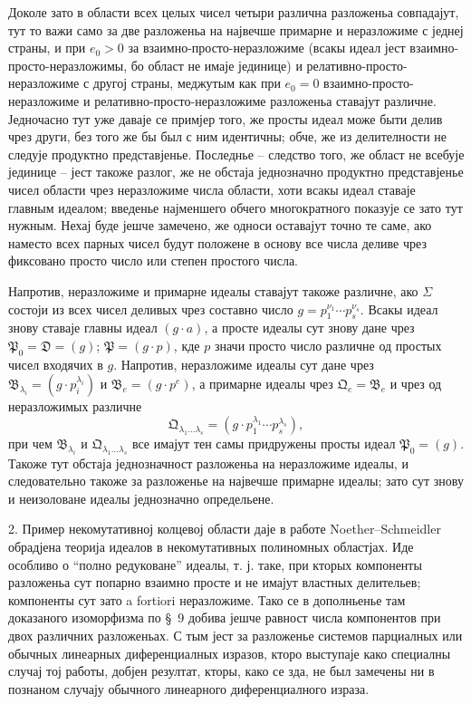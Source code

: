 ﻿\documentclass[11pt]{article}
\newcommand{\ideal}[1]{\mathfrak{#1}}
\begin{document}
Доколе зато в области всех целых чисел четыри различна разложеньа совпадајут, тут то важи само за две разложеньа на највечше примарне и неразложиме с једнеј страны, и при \(e_0>0\) за взаимно-просто-неразложиме (всакы идеал јест взаимно-просто-неразложимы, бо област не имаје јединице) и релативно-просто-неразложиме с другој страны, меджутым как при \(e_0=0\) взаимно-просто-неразложиме и релативно-просто-неразложиме разложеньа ставајут различне. Једночасно тут уже даваје се примјер того, же просты идеал може быти делив чрез други, без того же бы был с ним идентичны; обче, же из делителности не следује продуктно представјенье. Последнье -- следство того, же област не всебује јединице -- јест такоже разлог, же не обстаја једнозначно продуктно представјенье чисел области чрез неразложиме числа области, хоти всакы идеал ставаје главным идеалом; введенье најменшего обчего многократного показује се зато тут нужным. Нехај буде јешче замечено, же односи оставајут точно те саме, ако наместо всех парных чисел будут положене в основу все числа деливе чрез фиксовано просто число или степен простого числа.

Напротив, неразложиме и примарне идеалы ставајут такоже различне, ако \(\Sigma\) состоји из всех чисел деливых чрез составно число \(g=p_1^{\nu_1}\cdots p_s^{\nu_s}\). Всакы идеал знову ставаје главны идеал \((g\cdot a)\), а просте идеалы сут знову дане чрез \(\ideal P_0=\ideal D=(g)\); \(\ideal P=(g\cdot p)\), кде \(p\) значи просто число различне од простых чисел входячих в \(g\). Напротив, неразложиме идеалы сут дане чрез \(\ideal B_{\lambda_i}=(g\cdot p_i^{\lambda_i})\) и \(\ideal B_e=(g\cdot p^e)\), а примарне идеалы чрез \(\ideal Q_e=\ideal B_e\) и чрез од неразложимых различне
\[
 \ideal Q_{\lambda_1\ldots\lambda_s}=(g\cdot p_1^{\lambda_1}\cdots p_s^{\lambda_s}),
\]
при чем \(\ideal B_{\lambda_i}\) и \(\ideal Q_{\lambda_1\ldots\lambda_s}\) все имајут тен самы придружены просты идеал \(\ideal P_0=(g)\). Такоже тут обстаја једнозначност разложеньа на неразложиме идеалы, и следовательно такоже за разложенье на највечше примарне идеалы; зато сут знову и неизоловане идеалы једнозначно определьене.

2. Пример некомутативној колцевој области даје в работе Noether--Schmeidler обрадјена теорија идеалов в некомутативных полиномных областјах. Иде особливо о ``полно редуковане'' идеалы, т. ј. таке, при кторых компоненты разложеньа сут попарно взаимно просте и не имајут властных делительев; компоненты сут зато a fortiori неразложиме. Тако се в дополньенье там доказаного изоморфизма по \S~9 добива јешче равност числа компонентов при двох различних разложеньах. С тым јест за разложенье системов парциалных или обычных линеарных диференциалных изразов, кторо выступаје како специалны случај тој работы, добјен резултат, кторы, како се зда, не был замечены ни в познаном случају обычного линеарного диференциалного израза.
\end{document}
